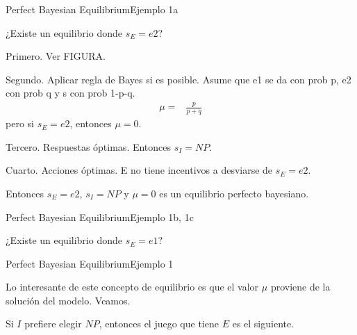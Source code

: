 \documentclass[notes, 11pt]{beamer} %
\newenvironment{wideitemize}{\itemize\addtolength{\itemsep}{10pt}}{\enditemize}
\begin{document}
\begin{frame}{Perfect Bayesian Equilibrium}{Ejemplo 1a}
\begin{wideitemize}
	\item<1-> ¿Existe un equilibrio donde $s_{E} = e2$?
	\begin{wideitemize}
		\item<2->[--] Primero. Ver FIGURA.
		\item<3->[--] Segundo. Aplicar regla de Bayes si es posible. Asume que e1 se da con prob p, e2 con prob q y s con prob 1-p-q. 
		\begin{align*}
			\mu = & \frac{ p }{ p + q } 
		\end{align*} pero si $s_{E} = e2$, entonces $\mu = 0$.
		\item<4->[--] Tercero. Respuestas \'optimas. Entonces $s_{I} = NP$.
		\item<5->[--] Cuarto. Acciones \'optimas. E no tiene incentivos a desviarse de $s_{E} = e2$.
	\end{wideitemize}
	\item<6-> Entonces $s_{E} = e2$, $s_{I} = NP$ y $\mu = 0$ es un equilibrio perfecto bayesiano.
\end{wideitemize}	
\end{frame}

\begin{frame}{Perfect Bayesian Equilibrium}{Ejemplo 1b, 1c}
\begin{wideitemize}
	\item<1-> ¿Existe un equilibrio donde $s_{E} = e1$?
\end{wideitemize}	
\end{frame}

\iffalse
\begin{frame}{Perfect Bayesian Equilibrium}{Ejemplo 1}
	\begin{wideitemize}
		\item<1-> Lo interesante de este concepto de equilibrio es que el valor $\mu$ proviene de la soluci\'on del modelo. Veamos.
		\item<2-> Si $I$ prefiere elegir $NP$, entonces el juego que tiene $E$ es el siguiente.
	\end{wideitemize}
\end{frame}
\end{document}
